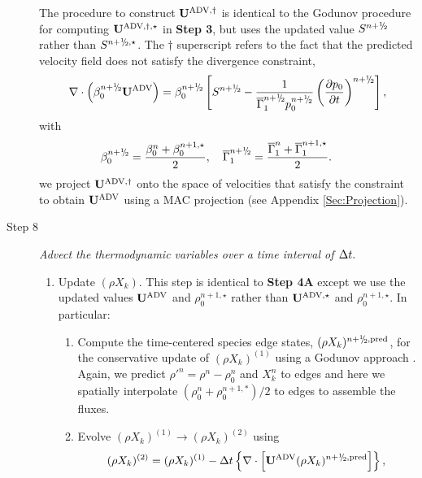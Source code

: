\begin{description}
The procedure to construct ${\bf{U}}^{\mathrm{ADV},\dagger}$ is identical to the Godunov procedure
for computing ${\bf{U}}^{\mathrm{ADV},\dagger,\star}$ in {\bf Step 3}, but uses
the updated value $S^{\nph}$ rather than $S^{\nph,\star}$.
The $\dagger$ superscript refers to the fact that the predicted velocity field does not satisfy the divergence constraint,
\begin{equation}
\nabla \cdot \left(\beta_0^{\nph} \uadvtwo\right) =
\beta_0^{\nph} \left[S^{\nph} - \frac{1}{\gammaonebar^{\nph}p_0^{\nph}}\left(\frac{\partial p_0}{\partial t}\right)^{\nph}\right],\label{eq:div2}
\end{equation}
with
\begin{equation}
\beta_0^{\nph} = \frac{ \beta_0^n +  \beta_0^{n+1,\star} }{2}, \quad
\gammaonebar^{\nph} = \frac{ \gammaonebar^n +  \gammaonebar^{n+1,\star} }{2}.
\qquad
\end{equation}
we project ${\bf{U}}^{\mathrm{ADV},\dagger}$ onto the space of velocities that satisfy the constraint to obtain ${\bf{U}}^{\mathrm{ADV}}$ using a MAC projection (see Appendix \ref{Sec:Projection}).

\item[Step 8] {\em Advect the thermodynamic variables over a time interval of $\Delta t.$}

\begin{enumerate}
\renewcommand{\theenumi}{{\bf \Alph{enumi}}}

\item Update $(\rho X_k)$.  This step is identical to {\bf Step 4A} except we use
  the updated values ${\bf{U}}^{\mathrm{ADV}}$ and $\rho_0^{n+1,\star}$ rather than
  ${\bf{U}}^{\mathrm{ADV},\star}$ and $\rho_0^{n+1,\star}$.  In particular:

\begin{enumerate}
\renewcommand{\labelenumii}{{\bf \roman{enumii}}.}

\item Compute the time-centered species edge states, $(\rho X_k)^{\nph,\pred}$,
  for the conservative update of $(\rho X_k)^{(1)}$ using a Godunov approach \citep{XRB_III}.
  Again, we predict $\rho'^n=\rho^n-\rho_0^n$ and $X_k^n$ to edges
  and here we spatially interpolate $(\rho_0^n+\rho_0^{n+1,*})/2$ to edges to assemble the fluxes.


\item Evolve $(\rho X_k)^{(1)} \rightarrow (\rho X_k)^{(2)}$ using
\begin{equation}
(\rho X_k)^{(2)} = (\rho X_k)^{(1)}
- \dt \left\{ \nabla \cdot \left[\uadvtwo (\rho X_k)^{\nph,\pred} \right] \right\},
\end{equation}


\end{enumerate}
\end{enumerate}
\end{description}
